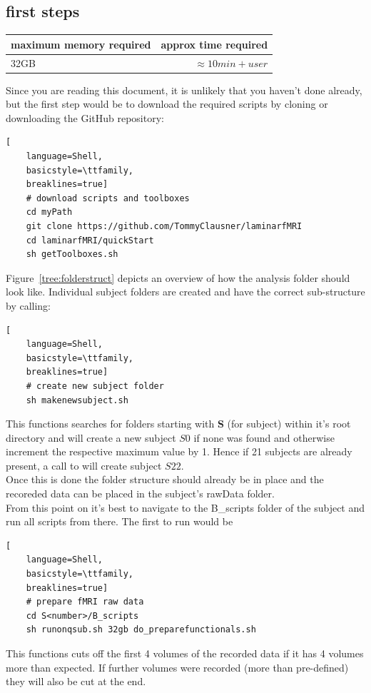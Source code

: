 \documentclass[12pt,a4paper]{scrartcl}
\begin{document}
\subsection{first steps}
\begin{table}[h]
\begin{tabular}{l | r}
\toprule
maximum memory required & approx time required\\\toprule
32GB & $\approx 10min+user$ \\\bottomrule
\end{tabular}
\end{table}
\FloatBarrier
\noindent Since you are reading this document, it is unlikely that you haven't done already, but the first step would be to download the required scripts by cloning or downloading the GitHub repository:
\begin{lstlisting}[
    language=Shell,
    basicstyle=\ttfamily,
    breaklines=true]
    # download scripts and toolboxes
    cd myPath
    git clone https://github.com/TommyClausner/laminarfMRI
    cd laminarfMRI/quickStart
    sh getToolboxes.sh
\end{lstlisting}
Figure~\ref{tree:folderstruct} depicts an overview of how the analysis folder should look like. Individual subject folders are created and have the correct sub-structure by calling:
\begin{lstlisting}[
    language=Shell,
    basicstyle=\ttfamily,
    breaklines=true]
    # create new subject folder
    sh makenewsubject.sh
 \end{lstlisting}
This functions searches for folders starting with \textbf{S} (for subject) within it's root directory and will create a new subject $S0$ if none was found and otherwise increment the respective maximum value by 1. Hence if 21 subjects are already present, a call to \texttt{} will create subject $S22$.\\
Once this is done the folder structure should already be in place and the recoreded data can be placed in the subject's rawData folder.\\
From this point on it's best to navigate to the B\_scripts folder of the subject and run all scripts from there. The first to run would be
\begin{lstlisting}[
    language=Shell,
    basicstyle=\ttfamily,
    breaklines=true]
    # prepare fMRI raw data
    cd S<number>/B_scripts
    sh runonqsub.sh 32gb do_preparefunctionals.sh
\end{lstlisting}
This functions cuts off the first 4 volumes of the recorded data if it has 4 volumes more than expected. If further volumes were recorded (more than pre-defined) they will also be cut at the end.
\end{document}
